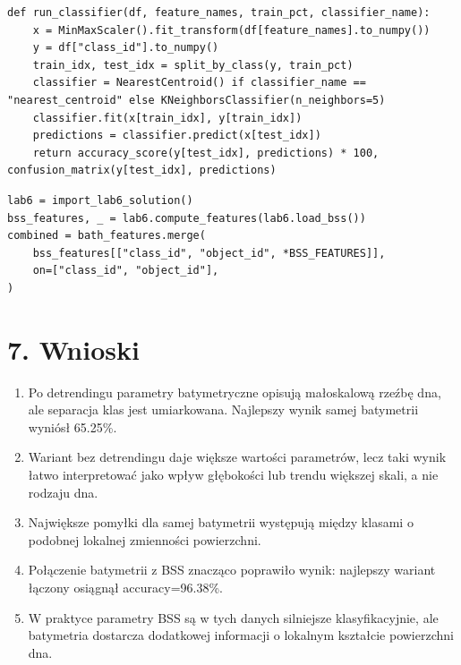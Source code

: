 \documentclass[11pt,a4paper]{article}
\begin{document}
\begin{lstlisting}[caption={Fragment własnego kodu: klasyfikacja i macierz niezgodności.}]
def run_classifier(df, feature_names, train_pct, classifier_name):
    x = MinMaxScaler().fit_transform(df[feature_names].to_numpy())
    y = df["class_id"].to_numpy()
    train_idx, test_idx = split_by_class(y, train_pct)
    classifier = NearestCentroid() if classifier_name == "nearest_centroid" else KNeighborsClassifier(n_neighbors=5)
    classifier.fit(x[train_idx], y[train_idx])
    predictions = classifier.predict(x[test_idx])
    return accuracy_score(y[test_idx], predictions) * 100, confusion_matrix(y[test_idx], predictions)
\end{lstlisting}


\begin{lstlisting}[caption={Fragment własnego kodu: połączenie batymetrii z cechami BSS.}]
lab6 = import_lab6_solution()
bss_features, _ = lab6.compute_features(lab6.load_bss())
combined = bath_features.merge(
    bss_features[["class_id", "object_id", *BSS_FEATURES]],
    on=["class_id", "object_id"],
)
\end{lstlisting}


\section*{7. Wnioski}
\begin{enumerate}
    \item Po detrendingu parametry batymetryczne opisują małoskalową rzeźbę dna, ale separacja klas jest umiarkowana. Najlepszy wynik samej batymetrii wyniósł 65.25\%.
    \item Wariant bez detrendingu daje większe wartości parametrów, lecz taki wynik łatwo interpretować jako wpływ głębokości lub trendu większej skali, a nie rodzaju dna.
    \item Największe pomyłki dla samej batymetrii występują między klasami o podobnej lokalnej zmienności powierzchni.
    \item Połączenie batymetrii z BSS znacząco poprawiło wynik: najlepszy wariant łączony osiągnął accuracy=96.38\%.
    \item W praktyce parametry BSS są w tych danych silniejsze klasyfikacyjnie, ale batymetria dostarcza dodatkowej informacji o lokalnym kształcie powierzchni dna.
\end{enumerate}
\end{document}
